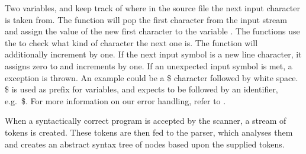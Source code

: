 Two variables,   and 
 keep track of where in the source file the next input
character is taken from. The function  will pop
the first character from the input stream and assign the value of
the new first character to the variable . The
 functions use the 
to check what kind of character the next one is. The 
function will additionally increment  by one. If
the next input symbol is a new line character, it assigns zero to
 and increments  by one. If an unexpected
input symbol is met, a  exception is thrown. An
example could be a \$ character followed by white space. \$ is used as
prefix for variables, and expects to be followed by an identifier, e.g.\
\$. For more information on our error handling, refer to
\secref{sec:errorhandling}.
 


When a syntactically correct program is accepted by the scanner, a
stream of tokens is created. These tokens are then fed to the parser,
which analyses them and creates an abstract syntax tree of nodes based
upon the supplied tokens.
